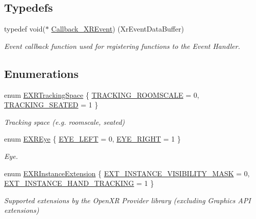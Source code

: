 \subsection*{Typedefs}
\begin{DoxyCompactItemize}
\item 
typedef void($\ast$ \mbox{\hyperlink{namespace_open_x_r_provider_a23b2e01bea1c0c0d762560792d8dff0f}{Callback\+\_\+\+X\+R\+Event}}) (Xr\+Event\+Data\+Buffer)
\begin{DoxyCompactList}\small\item\em Event callback function used for registering functions to the Event Handler. \end{DoxyCompactList}\end{DoxyCompactItemize}
\subsection*{Enumerations}
\begin{DoxyCompactItemize}
\item 
enum \mbox{\hyperlink{namespace_open_x_r_provider_a005dd91723b05b123b8fccbc41798b05}{E\+X\+R\+Tracking\+Space}} \{ \mbox{\hyperlink{namespace_open_x_r_provider_a005dd91723b05b123b8fccbc41798b05a5f2a13c525612f19c5c2a6db5f22f836}{T\+R\+A\+C\+K\+I\+N\+G\+\_\+\+R\+O\+O\+M\+S\+C\+A\+LE}} = 0, 
\mbox{\hyperlink{namespace_open_x_r_provider_a005dd91723b05b123b8fccbc41798b05aba26293ac81cbb568b44ae10f4af4ec9}{T\+R\+A\+C\+K\+I\+N\+G\+\_\+\+S\+E\+A\+T\+ED}} = 1
 \}
\begin{DoxyCompactList}\small\item\em Tracking space (e.\+g. roomscale, seated) \end{DoxyCompactList}\item 
enum \mbox{\hyperlink{namespace_open_x_r_provider_a8aa379869e30772896e6c468eb54f155}{E\+X\+R\+Eye}} \{ \mbox{\hyperlink{namespace_open_x_r_provider_a8aa379869e30772896e6c468eb54f155a1f7295c2ac801bf776369e51ad0f7e84}{E\+Y\+E\+\_\+\+L\+E\+FT}} = 0, 
\mbox{\hyperlink{namespace_open_x_r_provider_a8aa379869e30772896e6c468eb54f155ae4e90da36b75bc313108f4ea7283da97}{E\+Y\+E\+\_\+\+R\+I\+G\+HT}} = 1
 \}
\begin{DoxyCompactList}\small\item\em Eye. \end{DoxyCompactList}\item 
enum \mbox{\hyperlink{namespace_open_x_r_provider_ac7a3555ea86a858a7d56afa5dfb16cc3}{E\+X\+R\+Instance\+Extension}} \{ \mbox{\hyperlink{namespace_open_x_r_provider_ac7a3555ea86a858a7d56afa5dfb16cc3aafc2d84efc5f08ff5b64d1118fc40a6b}{E\+X\+T\+\_\+\+I\+N\+S\+T\+A\+N\+C\+E\+\_\+\+V\+I\+S\+I\+B\+I\+L\+I\+T\+Y\+\_\+\+M\+A\+SK}} = 0, 
\mbox{\hyperlink{namespace_open_x_r_provider_ac7a3555ea86a858a7d56afa5dfb16cc3a07f521c2e1b127d26a5f2e57ebe00a65}{E\+X\+T\+\_\+\+I\+N\+S\+T\+A\+N\+C\+E\+\_\+\+H\+A\+N\+D\+\_\+\+T\+R\+A\+C\+K\+I\+NG}} = 1
 \}
\begin{DoxyCompactList}\small\item\em Supported extensions by the Open\+XR Provider library (excluding Graphics A\+PI extensions) \end{DoxyCompactList}\end{DoxyCompactItemize}
